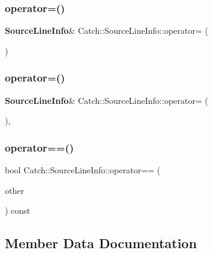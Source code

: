 \subsubsection{operator=()\hspace{0.1cm}{\footnotesize\ttfamily [1/2]}}
{\footnotesize\ttfamily \textbf{ Source\+Line\+Info}\& Catch\+::\+Source\+Line\+Info\+::operator= (\begin{DoxyParamCaption}\item[{\textbf{ Source\+Line\+Info} const \&}]{ }\end{DoxyParamCaption})\hspace{0.3cm}{\ttfamily [default]}}

\mbox{\label{struct_catch_1_1_source_line_info_ab8469b89d86bdd69b6b9f2b610600258}} 
\subsubsection{operator=()\hspace{0.1cm}{\footnotesize\ttfamily [2/2]}}
{\footnotesize\ttfamily \textbf{ Source\+Line\+Info}\& Catch\+::\+Source\+Line\+Info\+::operator= (\begin{DoxyParamCaption}\item[{\textbf{ Source\+Line\+Info} \&\&}]{ }\end{DoxyParamCaption})\hspace{0.3cm}{\ttfamily [default]}, {\ttfamily [noexcept]}}

\mbox{\label{struct_catch_1_1_source_line_info_af07e4fdeddf8409b91e4f842f6264cf8}} 
\subsubsection{operator==()}
{\footnotesize\ttfamily bool Catch\+::\+Source\+Line\+Info\+::operator== (\begin{DoxyParamCaption}\item[{\textbf{ Source\+Line\+Info} const \&}]{other }\end{DoxyParamCaption}) const\hspace{0.3cm}{\ttfamily [noexcept]}}



\subsection{Member Data Documentation}
\mbox{\label{struct_catch_1_1_source_line_info_ad65537703e9f08c1fa7777fbc3f0c617}} 
